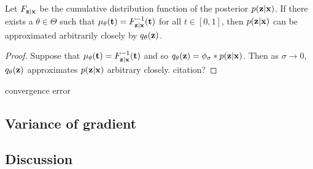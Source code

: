 \documentclass[10pt]{article}
\begin{document}
\begin{proposition}
Let $F_{\mathbf{z}|\mathbf{x}}$ be the cumulative distribution function of the posterior $p(\mathbf{z}|\mathbf{x})$. If there exists a $\theta\in\Theta$ such that $\mu_\theta(\mathbf{t})=F_{\mathbf{z}|\mathbf{x}}^{-1}(\mathbf{t})$ for all $t\in[0,1]$, then $p(\mathbf{z}|\mathbf{x})$ can be approximated arbitrarily closely by $q_\theta(\mathbf{z})$.
\end{proposition}
\begin{proof}
Suppose that $\mu_\theta(\mathbf{t})=F_{\mathbf{z}|\mathbf{x}}^{-1}(\mathbf{t})$ and so $q_\theta(\mathbf{z})=\phi_\sigma*p(\mathbf{z}|\mathbf{x})$. Then as $\sigma\rightarrow0$, $q_\theta(\mathbf{z})$ approximates $p(\mathbf{z}|\mathbf{x})$ arbitrary closely. \todo citation?
\end{proof}

\todo convergence error \citet{Kruijer:2010}


\subsection{Variance of gradient}

\subsection{Discussion}


\newpage




\end{document}
